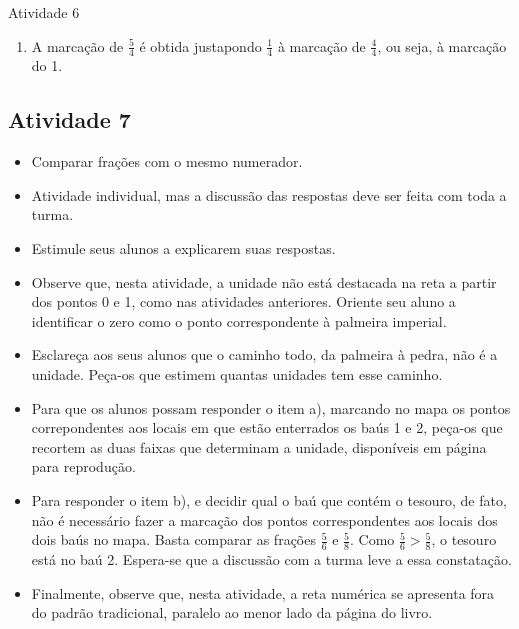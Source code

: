 \begin{multicols}{2}
\begin{resposta*}{Atividade 6}
\begin{enumerate} [\quad a)]
    \item       A marcação de       $\frac{5}{4}$       é obtida justapondo       $\frac{1}{4}$       à marcação de       $\frac{4}{4}$, ou seja, à marcação do 1.

    
 
    \end{enumerate} %
  
\end{resposta*}


\subsection{Atividade 7}

\begin{itemize} %
    \item       Comparar frações com o mesmo numerador.
\end{itemize} %
  
\begin{itemize} %
    \item       Atividade individual, mas a discussão das respostas deve ser feita com toda a turma.
    \item       Estimule seus alunos a explicarem suas respostas.
    \item       Observe que, nesta atividade, a unidade não está destacada na reta a partir dos pontos 0 e 1, como nas atividades anteriores. Oriente seu aluno a identificar o zero como o ponto correspondente à palmeira imperial. 
    \item       Esclareça aos seus alunos que o caminho todo, da palmeira à pedra, não é a unidade. Peça-os que estimem quantas unidades tem esse caminho.
    \item       Para que os alunos possam responder o item a), marcando no mapa os pontos correpondentes aos locais em que estão enterrados os baús 1 e 2, peça-os que recortem as duas faixas que determinam a unidade, disponíveis em página para reprodução.  
    \item       Para responder o item b), e decidir qual o baú que contém o tesouro, de fato, não é necessário fazer a marcação dos pontos correspondentes aos locais dos dois baús no mapa. Basta comparar as frações       $\frac{5}{6}$       e       $\frac{5}{8}$. Como        $\frac{5}{6}  > \frac{5}{8}$, o tesouro está no baú 2.  Espera-se que a discussão com a turma leve a essa constatação. 
    \item       Finalmente, observe que, nesta atividade, a reta numérica se apresenta fora do padrão tradicional, paralelo ao menor lado da página do livro.
\end{itemize} %


\end{multicols}
